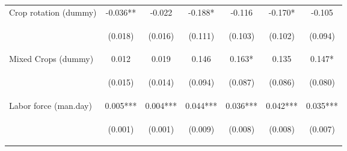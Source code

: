 \begin{center}
\begin{tabular}{lcccccc}
Crop rotation (dummy) & -0.036** & -0.022 & -0.188* & -0.116 & -0.170* & -0.105 \\
\vspace{4pt} & \begin{footnotesize}(0.018)\end{footnotesize} & \begin{footnotesize}(0.016)\end{footnotesize} & \begin{footnotesize}(0.111)\end{footnotesize} & \begin{footnotesize}(0.103)\end{footnotesize} & \begin{footnotesize}(0.102)\end{footnotesize} & \begin{footnotesize}(0.094)\end{footnotesize} \\
Mixed Crops (dummy) & 0.012 & 0.019 & 0.146 & 0.163* & 0.135 & 0.147* \\
\vspace{4pt} & \begin{footnotesize}(0.015)\end{footnotesize} & \begin{footnotesize}(0.014)\end{footnotesize} & \begin{footnotesize}(0.094)\end{footnotesize} & \begin{footnotesize}(0.087)\end{footnotesize} & \begin{footnotesize}(0.086)\end{footnotesize} & \begin{footnotesize}(0.080)\end{footnotesize} \\
Labor force (man.day) & 0.005*** & 0.004*** & 0.044*** & 0.036*** & 0.042*** & 0.035*** \\
\vspace{4pt} & \begin{footnotesize}(0.001)\end{footnotesize} & \begin{footnotesize}(0.001)\end{footnotesize} & \begin{footnotesize}(0.009)\end{footnotesize} & \begin{footnotesize}(0.008)\end{footnotesize} & \begin{footnotesize}(0.008)\end{footnotesize} & \begin{footnotesize}(0.007)\end{footnotesize} \\

\end{tabular}
\end{center}
